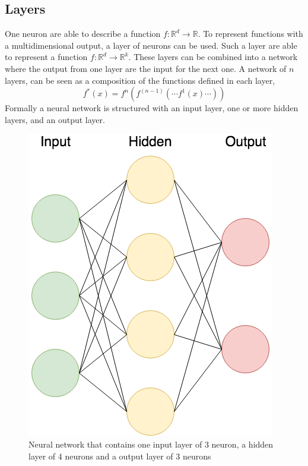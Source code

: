\documentclass[11pt]{article}
\begin{document}
\subsection{Layers}\label{sec:deep_learning_layers}

One neuron are able to describe a function $f : \mathbb{R}^{d} \rightarrow \mathbb{R}$. To represent functions with a multidimensional output, a layer of neurons can be used. Such a layer are able to represent a function $f : \mathbb{R}^{d} \rightarrow \mathbb{R}^{k}$. These layers can be combined into a network where the output from one layer are the input for the next one. A network of $n$ layers, can be seen as a composition of the functions defined in each layer,
\begin{equation}\label{eq:layer_functions}
    f^{\ast}(x) = f^{n}(f^{(n - 1)}(\cdots f^{1}(x) \cdots))
\end{equation}
Formally a neural network is structured with an input layer, one or more hidden layers, and an output layer. 
\begin{figure}[!h]
    \centering
    \includegraphics[scale = 0.4]{figurer/deep_learning/neural_net.png}
    \caption{Neural network that contains one input layer of 3 neuron, a hidden layer of 4 neurons and a output layer of 3 neurons}
    \label{fig:deep_learning_layers}
\end{figure}
\end{document}
